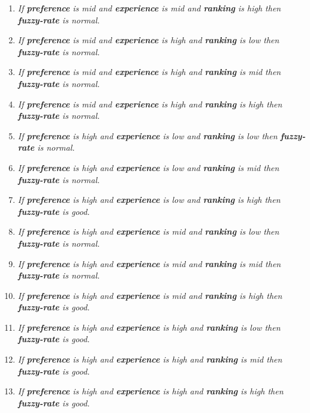 \begin{enumerate}
\item \textit{If \textbf{preference} is mid and 
\textbf{experience} is mid and \textbf{ranking} is high then \textbf{fuzzy-rate} is normal.}
\item \textit{If \textbf{preference} is mid and 
\textbf{experience} is high and \textbf{ranking} is low then \textbf{fuzzy-rate} is normal.}
\item \textit{If \textbf{preference} is mid and 
\textbf{experience} is high and \textbf{ranking} is mid then \textbf{fuzzy-rate} is normal.}
\item \textit{If \textbf{preference} is mid and 
\textbf{experience} is high and \textbf{ranking} is high then \textbf{fuzzy-rate} is normal.}
\item \textit{If \textbf{preference} is high and 
\textbf{experience} is low and \textbf{ranking} is low then \textbf{fuzzy-rate} is normal.}\
\item \textit{If \textbf{preference} is high and 
\textbf{experience} is low and \textbf{ranking} is mid then \textbf{fuzzy-rate} is normal.}\
\item \textit{If \textbf{preference} is high and 
\textbf{experience} is low and \textbf{ranking} is high then \textbf{fuzzy-rate} is good.}\
\item \textit{If \textbf{preference} is high and 
\textbf{experience} is mid and \textbf{ranking} is low then \textbf{fuzzy-rate} is normal.}\
\item \textit{If \textbf{preference} is high and 
\textbf{experience} is mid and \textbf{ranking} is mid then \textbf{fuzzy-rate} is normal.}\
\item \textit{If \textbf{preference} is high and 
\textbf{experience} is mid and \textbf{ranking} is high then \textbf{fuzzy-rate} is good.}\
\item \textit{If \textbf{preference} is high and 
\textbf{experience} is high and \textbf{ranking} is low then \textbf{fuzzy-rate} is good.}\
\item \textit{If \textbf{preference} is high and 
\textbf{experience} is high and \textbf{ranking} is mid then \textbf{fuzzy-rate} is good.}\
\item \textit{If \textbf{preference} is high and 
\textbf{experience} is high and \textbf{ranking} is high then \textbf{fuzzy-rate} is good.}\

\end{enumerate} 

